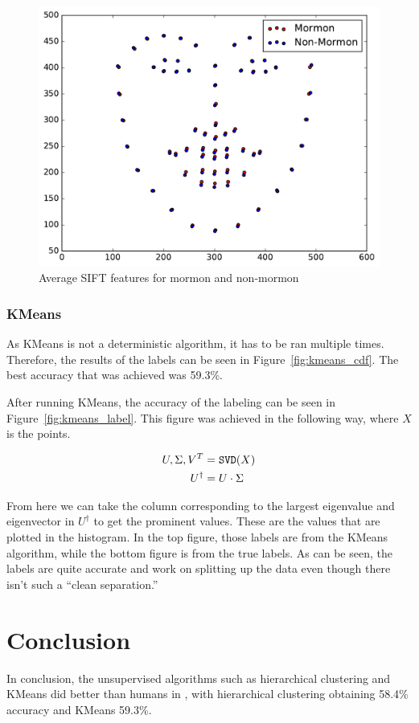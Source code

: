 \documentclass{article}
\begin{document}
\begin{figure}
\centering
\includegraphics[width=.65\linewidth]{data/average_sift.pdf}
\caption{Average SIFT features for mormon and non-mormon}
\label{fig:sift_avg}
\end{figure}

\subsubsection*{KMeans}

As KMeans is not a deterministic algorithm, it has to be ran multiple times. Therefore, the results of the labels can be seen in Figure~\ref{fig:kmeans_cdf}. The best accuracy that was achieved was 59.3\%. 

After running KMeans, the accuracy of the labeling can be seen in Figure~\ref{fig:kmeans_label}. This figure was achieved in the following way, where $X$ is the points.

\begin{align*}
  U, \Sigma, V^{T} &= {\tt SVD}(X)\\
  U^{\dagger} &= U\cdot \Sigma
\end{align*}

From here we can take the column corresponding to the largest eigenvalue and eigenvector in $U^{\dagger}$ to get the prominent values. These are the values that are plotted in the histogram. In the top figure, those labels are from the KMeans algorithm, while the bottom figure is from the true labels. As can be seen, the labels are quite accurate and work on splitting up the data even though there isn't such a ``clean separation.''

\section*{Conclusion}

In conclusion, the unsupervised algorithms such as hierarchical clustering and KMeans did better than humans in \cite{MormonID}, with hierarchical clustering obtaining 58.4\% accuracy and KMeans 59.3\%. 
\end{document}
